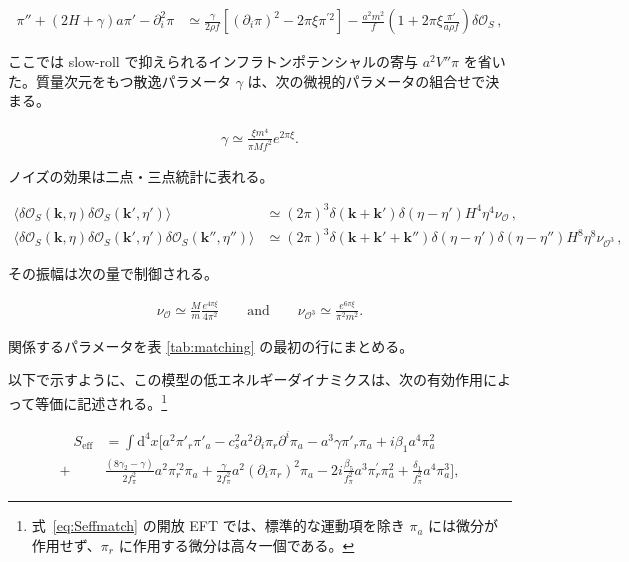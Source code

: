 \documentclass[a4paper,11pt]{ltjsarticle}
\numberwithin{equation}{section}
\def\pia{\pi_{a}}
\def\pir{\pi_{r}}
\newcommand{\dd}{\mathrm{d}}
\newcommand{\ee}{e}
\newcommand{\boldmathsymbol}[1]{{\ensuremath{\boldsymbol{#1}}}}
\newcommand{\bmk}{\boldmathsymbol{k}}
\newcommand{\Eq}[1]{Eq.~(\ref{#1})}
\def\bmk{{\boldsymbol{k}}}
\renewcommand{\Eq}[1]{式~\eqref{#1}}
\begin{document}
\begin{align}\label{eq:Paolo}
\pi'' + \left( 2H + \gamma\right)a\pi' - \partial_i^2 \pi &\simeq \frac{\gamma}{2\rho f} \left[ \left( \partial_i \pi\right)^2 - 2 \pi \xi \pi^{\prime2}\right] - \frac{a^2m^2}{f} \left(1+2\pi\xi \frac{\pi'}{a \rho f} \right) \delta \mathcal{O}_S\,,
\end{align}

ここでは slow-roll で抑えられるインフラトンポテンシャルの寄与 $a^2V''\pi$ を省いた。質量次元をもつ散逸パラメータ $\gamma$ は、次の微視的パラメータの組合せで決まる。

\begin{align}\label{eq:gammaCrem}
\gamma \simeq \frac{\xi m^4}{\pi M f^2} \ee^{2 \pi \xi}.
\end{align}

ノイズの効果は二点・三点統計に表れる。

\begin{align}
\langle  \delta \mathcal{O}_S(\bmk, \eta) \delta \mathcal{O}_S(\bmk',\eta')\rangle &\simeq (2\pi)^3 \delta(\bmk + \bmk') \delta(\eta - \eta')H^4 \eta^4 \nu_{\mathcal{O}}\,, \\
\langle  \delta \mathcal{O}_S(\bmk, \eta) \delta \mathcal{O}_S(\bmk',\eta')  \delta \mathcal{O}_S(\bmk'',\eta'')\rangle &\simeq (2\pi)^3 \delta(\bmk + \bmk' +\bmk'') \delta(\eta - \eta') \delta(\eta - \eta'')H^8 \eta^8 \nu_{\mathcal{O}^3} \,,\label{eq:NGnoiseCrem}
\end{align}

その振幅は次の量で制御される。

\begin{align}
\nu_{\mathcal{O}} \simeq \frac{M}{m} \frac{\ee^{4\pi \xi}}{4\pi^2} \qquad \mathrm{and} \qquad \nu_{\mathcal{O}^3} \simeq \frac{\ee^{6\pi \xi}}{\pi^2 m^2} .
\end{align}

関係するパラメータを表 \ref{tab:matching} の最初の行にまとめる。

以下で示すように、この模型の低エネルギーダイナミクスは、次の有効作用によって等価に記述される。\footnote{\Eq{eq:Seffmatch} の開放 EFT では、標準的な運動項を除き $\pia$ には微分が作用せず、$\pir$ に作用する微分は高々一個である。}

\begin{align}\label{eq:Seffmatch}
\quad S_{\mathrm{eff}} &= \int \dd^4 x \Big[ a^2 \pi'_{r} \pi'_{a} - c_{s}^{2} a^2 \partial_i \pir  \partial^i \pia   -  a^3 \gamma \pi'_{r} \pia + i \beta_1 a^4 \pia^2 \nonumber \\
+ &\frac{ \left(8\gamma_2 - \gamma\right)}{2f^{2}_{\pi}}  a^2\pir^{\prime2} \pia	+ \frac{\gamma}{2f_{\pi}^{2}} a^2	\left(\partial_i \pir \right)^2 \pia - 2i\frac{\beta_{5}}{f_\pi^2} a^3 \pir^{\prime} \pia^2 +\frac{\delta_1}{f_\pi^2} a^4 \pia^3  \Big],
\end{align}
\end{document}
